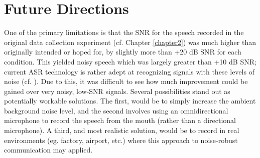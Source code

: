 


\section{Future Directions}\label{chap5:future-research}

One of the primary limitations is that the SNR for the speech recorded in the original data collection experiment (cf. Chapter \ref{chapter2}) was much higher than originally intended or hoped for, by slightly more than +20 dB SNR for each condition.  This yielded noisy speech which was largely greater than +10 dB SNR; current ASR technology is rather adept at recognizing signals with these levels of noise (cf. \cite{braun:16}).  Due to this, it was difficult to see how much improvement could be gained over very noisy, low-SNR signals.  Several possibilities stand out as potentially workable solutions.  The first, would be to simply increase the ambient background noise level, and the second involves using an omnidirectional microphone to record the speech from the mouth (rather than a directional microphone).  A third, and most realistic solution, would be to record in real environments (eg. factory, airport, etc.) where this approach to noise-robust communication may applied.

